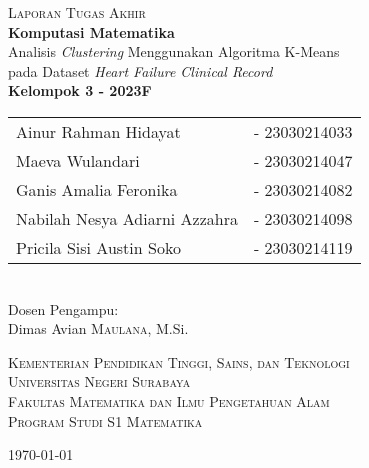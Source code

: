 \documentclass[english,12pt,a4paper,openany]{book}
\begin{document}
	
	\begin{titlepage}
		\centering
		{\Large \textsc{Laporan Tugas Akhir}}\\[2ex]
		{\LARGE \bfseries Komputasi Matematika}\\[8ex]
		{\large Analisis \textit{Clustering} Menggunakan Algoritma K-Means\\
			pada Dataset \textit{Heart Failure Clinical Record}}\\[1.5cm]
		
		\textbf{Kelompok 3 - 2023F}\\[2ex]
		
		\begin{tabular}{l l}
			Ainur Rahman Hidayat & - 23030214033 \\
			Maeva Wulandari & - 23030214047 \\
			Ganis Amalia Feronika & - 23030214082 \\
			Nabilah Nesya Adiarni Azzahra & - 23030214098 \\
			Pricila Sisi Austin Soko & - 23030214119 \\
		\end{tabular}\\[3cm]
		
		Dosen Pengampu:\\[1ex]
		Dimas Avian \textsc{Maulana}, M.Si.\\
		
		\vfill
		
		{\large \textsc{Kementerian Pendidikan Tinggi, Sains, dan Teknologi}} \\
		{\large \textsc{Universitas Negeri Surabaya}} \\
		{\large \textsc{Fakultas Matematika dan Ilmu Pengetahuan Alam}} \\
		{\large \textsc{Program Studi S1 Matematika}}\\
		
		\vspace{1cm}
		
		{\large \today}\par
		
	\end{titlepage}
	\tableofcontents
	
\end{document}
